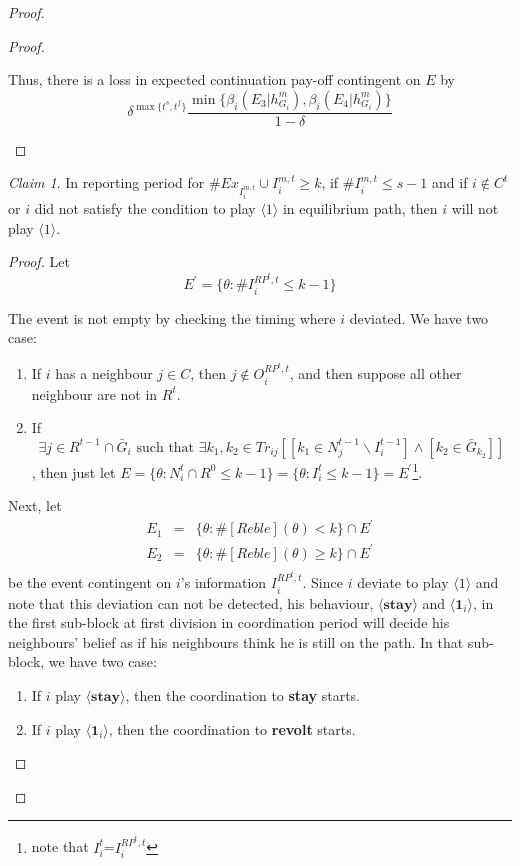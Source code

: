 \documentclass[12pt,letter]{article}
\theoremstyle{definition}
\theoremstyle{remark}
\theoremstyle{claim}
\newtheorem{claim}{Claim}
\begin{document}
\begin{proof}
\begin{proof}
\begin{enumerate}
Thus, there is a loss in expected continuation pay-off contingent on $E$ by
\[\delta^{\max\{t^s,t^f\}}\frac{\min\{\beta_{i}(E_3|h^{m}_{G_i}),\beta_{i}(E_4|h^{m}_{G_i})\}}{1-\delta}\]
\end{enumerate}


\end{proof}



\begin{claim} 
\label{claim_can_not_pretend_almost_success}
In reporting period for $\#Ex_{I^{m,t}_i}\cup I^{m,t}_i\geq k$, if $\#I^{m,t}_i\leq s-1$ and if $i\notin C^t$ or $i$ did not satisfy the condition to play $\langle 1 \rangle$ in equilibrium path, then $i$ will not play $\langle 1 \rangle$.
\end{claim}


\begin{proof}


Let
\[E^{'}=\{\theta:\#I^{RP^t,t}_i\leq k-1\}\]

The event is not empty by checking the timing where $i$ deviated. We have two case:
\begin{enumerate}
\item If $i$ has a neighbour $j\in C$, then $j\not\in O^{RP^t,t}_i$, and then suppose all other neighbour are not in $R^t$.
\item If \[\exists j\in R^{t-1}\cap \bar{G}_i \text{ such that } \exists k_1,k_2\in Tr_{ij}[[k_1\in N^{t-1}_j\backslash I^{t-1}_i] \wedge [k_2\in \bar{G}_{k_2}]]\], then just let $E=\{\theta: N^t_i\cap R^0\leq k-1\}=\{\theta: I^t_i\leq k-1\}=E^{'}$\footnote{note that $I^t_i$=$I^{RP^t,t}_i$}.
\end{enumerate}

Next, let 
\begin{eqnarray*}
E_1&=&\{\theta: \#[Reble](\theta)<k\}\cap E^{'}\\
E_2&=&\{\theta: \#[Reble](\theta)\geq k\}\cap E^{'}\\
\end{eqnarray*}
be the event contingent on $i$'s information $I^{RP^t,t}_i$. Since $i$ deviate to play $\langle 1 \rangle$ and note that this deviation can not be detected, his behaviour, $\langle \textbf{stay} \rangle$ and $\langle \mathbf{1}_i \rangle$, in the first sub-block at first division in coordination period will decide his neighbours' belief as if his neighbours think he is still on the path. In that sub-block, we have two case:
\begin{enumerate}
\item If $i$ play $\langle \textbf{stay} \rangle$, then the coordination to \textbf{stay} starts.
\item If $i$ play $\langle \mathbf{1}_i \rangle$, then the coordination to \textbf{revolt} starts.
\end{enumerate}


\end{proof}
\end{proof}
\end{document}
